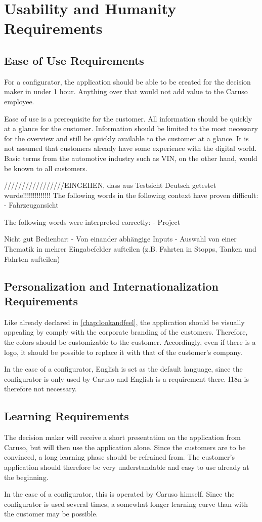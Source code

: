 \chapter{Usability and Humanity Requirements}

\section{Ease of Use Requirements}
For a configurator, the application should be able to be created for the decision maker in under 1 hour. 
Anything over that would not add value to the Caruso employee.


Ease of use is a prerequisite for the customer. All information should be quickly at a glance for the customer. 
Information should be limited to the most necessary for the overview and still be quickly available to the customer at a glance.
It is not assumed that customers already have some experience with the digital world. 
Basic terms from the automotive industry such as VIN, on the other hand, would be known to all customers.

/////////////////EINGEHEN, dass aus Testsicht Deutsch getestet wurde!!!!!!!!!!!!!!
The following words in the following context have proven difficult:
- Fahrzeugansicht

The following words were interpreted correctly:
- Project


Nicht gut Bedienbar:
- Von einander abhängige Inputs
- Auswahl von einer Thematik in mehrer Eingabefelder aufteilen (z.B. Fahrten in Stopps, Tanken und Fahrten aufteilen)



\section{Personalization and Internationalization Requirements}
Like already declared in \autoref{chap:lookandfeel}, the application should be visually appealing by comply with the corporate branding of the customers.
Therefore, the colors should be customizable to the customer. Accordingly, even if there is a logo, it should be possible to replace it with that of the customer's company.

In the case of a configurator, English is set as the default language, since the configurator is only used by Caruso and English is a requirement there. I18n is therefore not necessary.

\section{Learning Requirements}
The decision maker will receive a short presentation on the application from Caruso, but will then use the application alone. 
Since the customers are to be convinced, a long learning phase should be refrained from.
The customer's application should therefore be very understandable and easy to use already at the beginning. 


In the case of a configurator, this is operated by Caruso himself. 
Since the configurator is used several times, a somewhat longer learning curve than with the customer may be possible. 